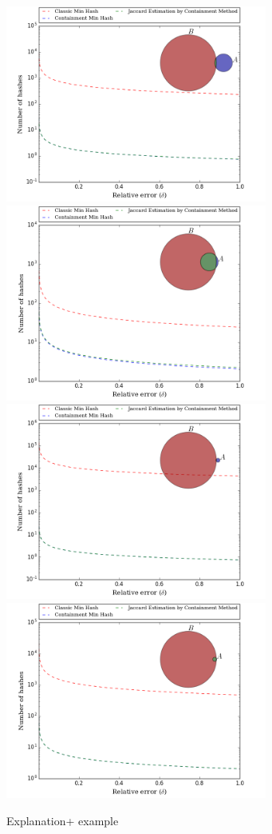 \documentclass[11pt]{amsart}
\theoremstyle{remark}
\numberwithin{equation}{section}
\begin{document}
\begin{figure}[!h]%
\begin{center}
\includegraphics[width=3.39in,trim={0 0 0 0in},clip]{Figs/deltaK-1010.png}%
\hspace{-.327in}
\includegraphics[width=3.39in,trim={0 0 0 0in},clip]{Figs/deltaK-1090.png}\\
\includegraphics[width=3.39in,trim={0 0 0 0in},clip]{Figs/deltaK-20010.png}%
\hspace{-.327in}
\includegraphics[width=3.39in,trim={0 0 0 0in},clip]{Figs/deltaK-20090.png}
\end{center}
\caption{Explanation+ example }
\label{fig:DeltaK}%
\end{figure}
\end{document}
